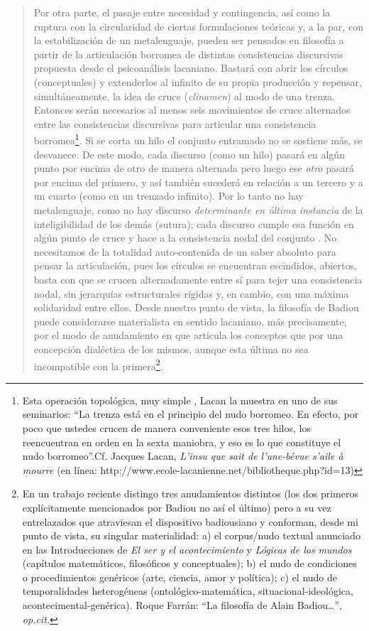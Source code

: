 \begin{quote}
Por otra parte, el pasaje entre necesidad y contingencia, así como la ruptura con la circularidad de ciertas formulaciones teóricas y, a la par, con la estabilización de un metalenguaje, pueden ser pensados en filosofía a partir de la articulación borromea de distintas consistencias discursivas propuesta desde el psicoanálisis lacaniano. Bastará con abrir los círculos (conceptuales) y extenderlos al infinito de su propia producción y repensar, simultáneamente, la idea de cruce (\emph{clinamen}) al modo de una trenza. Entonces serán necesarios al menos seis movimientos de cruce alternados entre las consistencias discursivas para articular una consistencia borromea\footnote{Esta operación topológica, muy simple , Lacan la muestra en uno de sus seminarios: \enquote{La trenza está en el principio del nudo borromeo. En efecto, por poco que ustedes crucen de manera conveniente esos tres hilos, los reencuentran en orden en la sexta maniobra, y eso es lo que constituye el nudo borromeo}.Cf. Jacques Lacan, \emph{L'insu que sait de l'une-bévue s'aile à mourre} (en línea: http://www.ecole-lacanienne.net/bibliotheque.php?id=13)}. Si se corta un hilo el conjunto entramado no se sostiene más, se desvanece. De este modo, cada discurso (como un hilo) pasará en algún punto por encima de otro de manera alternada  pero luego ese \emph{otro} pasará por encima del primero, y así también sucederá en relación a un tercero y a un cuarto (como en un trenzado infinito). Por lo tanto no hay metalenguaje, como no hay discurso \emph{determinante en última instancia} de la inteligibilidad de los demás (sutura); cada discurso cumple esa función en algún punto de cruce y hace a la consistencia nodal del conjunto . No necesitamos de la totalidad auto-contenida de un saber absoluto para pensar la articulación, pues los círculos se encuentran escindidos, abiertos, basta con que se crucen alternadamente entre sí para tejer una consistencia nodal, sin jerarquías estructurales rígidas y, en cambio, con una máxima solidaridad entre ellos. Desde nuestro punto de vista, la filosofía de Badiou puede considerarse materialista en sentido lacaniano, más precisamente, por el modo de anudamiento en que articula los conceptos que por una concepción dialéctica de los mismos, aunque esta última no sea incompatible con la primera\footnote{En un trabajo reciente distingo tres anudamientos distintos (los dos primeros explícitamente mencionados por Badiou no así el último) pero a su vez entrelazados que atraviesan el dispositivo badiousiano y conforman, desde mi punto de vista, su singular materialidad: a) el corpus/nudo textual anunciado en las Introducciones de \emph{El ser y el acontecimiento} y \emph{Lógicas de los mundos} (capítulos matemáticos, filosóficos y conceptuales); b) el nudo de condiciones o procedimientos genéricos (arte, ciencia, amor y política); c) el nudo de temporalidades heterogéneas (ontológico-matemática, situacional-ideológica, acontecimental-genérica). Roque Farrán: \enquote{La filosofía de Alain Badiou\ldots}, \emph{op.cit.}}.


\end{quote}
